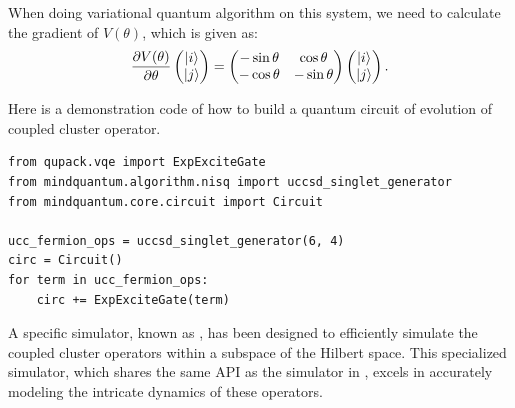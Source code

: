 When doing variational quantum algorithm on this system, we need to calculate the gradient of $V(\theta)$, which is given as:
\begin{equation}
    \frac{\partial V(\theta)}{\partial\theta}\begin{pmatrix}
        \ket{i} \\\ket{j}
    \end{pmatrix}=\begin{pmatrix}
        -\sin\theta & \cos\theta  \\
        -\cos\theta & -\sin\theta
    \end{pmatrix}\begin{pmatrix}
        \ket{i} \\\ket{j}
    \end{pmatrix}.
\end{equation}

Here is a demonstration code of how to build a quantum circuit of evolution of coupled cluster operator.

\begin{lstlisting}
from qupack.vqe import ExpExciteGate
from mindquantum.algorithm.nisq import uccsd_singlet_generator
from mindquantum.core.circuit import Circuit

ucc_fermion_ops = uccsd_singlet_generator(6, 4)
circ = Circuit()
for term in ucc_fermion_ops:
    circ += ExpExciteGate(term)
\end{lstlisting}

A specific simulator, known as , has been designed to efficiently simulate the coupled cluster operators within a subspace of the Hilbert space. This specialized simulator, which shares the same API as the simulator in \MindQuantum, excels in accurately modeling the intricate dynamics of these operators.
